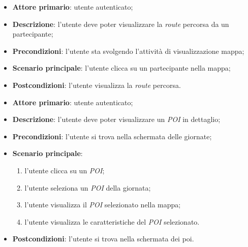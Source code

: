 \label{uc:vis_route_percorsa}
\begin{itemize}
	\item \textbf{Attore primario}: utente autenticato;
	\item \textbf{Descrizione}: l'utente deve poter visualizzare la \textit{route} percorsa da un partecipante;
	\item \textbf{Precondizioni}: l'utente sta svolgendo l'attività di visualizzazione mappa;
	\item \textbf{Scenario principale}: l'utente clicca su un partecipante nella mappa;
	\item \textbf{Postcondizioni}: l'utente visualizza la \textit{route} percorsa.
\end{itemize}

\label{uc:vis_poi}
\begin{itemize}
	\item \textbf{Attore primario}: utente autenticato;
	\item \textbf{Descrizione}: l'utente deve poter visualizzare un \textit{POI} in dettaglio;
    \item \textbf{Precondizioni}: l'utente si trova nella schermata delle giornate;
	\item \textbf{Scenario principale}:
    \begin{enumerate}
        \item l'utente clicca su un \textit{POI};
        \item l'utente seleziona un \textit{POI} della giornata;
        \item l'utente visualizza il \textit{POI} selezionato nella mappa;
        \item l'utente visualizza le caratteristiche del \textit{POI} selezionato.
    \end{enumerate}
	\item \textbf{Postcondizioni}: l'utente si trova nella schermata dei poi.
\end{itemize}

